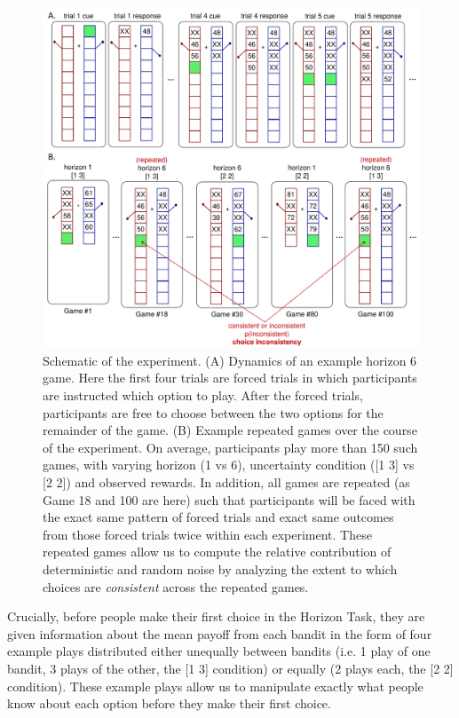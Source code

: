 \documentclass[12pt]{article}
\begin{document}
	\begin{figure}[hp]
		\begin{center}
			\includegraphics[width=\textwidth]{figures/taskfiga.pdf}
			\caption{ 
				Schematic of the experiment. (A) Dynamics of an example horizon 6 game.  Here the first four trials are forced trials in which participants are instructed which option to play.  After the forced trials, participants are free to choose between the two options for the remainder of the game.  (B) Example repeated games over the course of the experiment.
				On average, participants play more than 150 such games, with varying horizon (1 vs 6), uncertainty condition ([1 3] vs [2 2]) and observed rewards.  In addition, all games are repeated (as Game 18 and 100 are here) such that participants will be faced with the exact same pattern of forced trials and exact same outcomes from those forced trials twice within each experiment.  These repeated games allow us to compute the relative contribution of deterministic and random noise by analyzing the extent to which choices are {\em consistent} across the repeated games.}
			\label{fig:taskfig}
		\end{center}
	\end{figure}
	
	Crucially, before people make their first choice in the Horizon Task, they are given information about the mean payoff from each bandit in the form of four example plays distributed either unequally between bandits (i.e. 1 play of one bandit, 3 plays of the other, the [1 3] condition) or equally (2 plays each, the [2 2] condition). These example plays allow us to manipulate exactly what people know about each option before they make their first choice. 
	
\end{document}
